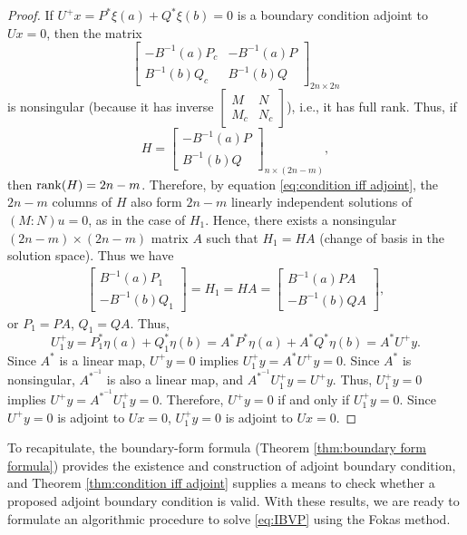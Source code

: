 \documentclass[11pt, oneside, a4paper]{article}
\begin{document}
\begin{proof}
    If $U^+x=P^*\xi(a) + Q^*\xi(b)=0$ is a boundary condition adjoint to $Ux=0$, then the matrix
    \[\begin{bmatrix}
        -B^{-1}(a)P_c & -B^{-1}(a)P\\
        B^{-1}(b)Q_c & B^{-1}(b)Q
    \end{bmatrix}_{2n\times 2n}\]
is nonsingular (because it has inverse $\begin{bmatrix}M & N\\ M_c & N_c\end{bmatrix}$), i.e., it has full rank. Thus, if 
    \[H = \begin{bmatrix}
        -B^{-1}(a)P\\
        B^{-1}(b)Q
    \end{bmatrix}_{n\times (2n-m)},\]
    then $\operatorname{rank}(H)=2n-m$. Therefore, by equation \eqref{eq:condition iff adjoint}, the $2n-m$ columns of $H$ also form $2n-m$ linearly independent solutions of $(M:N)u=0$, as in the case of $H_1$. Hence, there exists a nonsingular $(2n-m)\times (2n-m)$ matrix $A$ such that $H_1=HA$ (change of basis in the solution space). 
    Thus we have
    \begin{align*}
        \begin{bmatrix}
            B^{-1}(a)P_1\\
            -B^{-1}(b)Q_1
        \end{bmatrix} = H_1 = HA = \begin{bmatrix}
            B^{-1}(a)PA\\
            -B^{-1}(b)QA
        \end{bmatrix},
    \end{align*}
    or $P_1=PA$, $Q_1=QA$. Thus, 
    \[U_1^+y = P_1^*\eta(a) + Q_1^*\eta(b) = A^*P^*\eta(a) + A^*Q^*\eta(b)= A^* U^+y.\]
    Since $A^*$ is a linear map, $U^+y=0$ implies $U_1^+y=A^*U^+y=0$. Since $A^*$ is nonsingular, $A^{*^{-1}}$ is also a linear map, and $A^{*^{-1}}U_1^+y = U^+y$. Thus, $U_1^+y=0$ implies $U^+y=A^{*^{-1}}U_1^+y=0$. Therefore, $U^+y=0$ if and only if $U_1^+y=0$. Since $U^+y=0$ is adjoint to $Ux=0$, $U_1^+y=0$ is adjoint to $Ux=0$.
\end{proof}

To recapitulate, the boundary-form formula (Theorem \ref{thm:boundary form formula}) provides the existence and construction of adjoint boundary condition, and Theorem \ref{thm:condition iff adjoint} supplies a means to check whether a proposed adjoint boundary condition is valid. With these results, we are ready to formulate an algorithmic procedure to solve \eqref{eq:IBVP} using the Fokas method.
\end{document}
